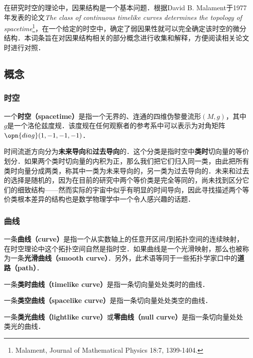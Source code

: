 



在研究时空的理论中，因果结构是一个基本问题．根据David B. Malament于1977年发表的论文\textsl{The class of continuous timelike curves determines the topology of spacetime}\footnote{Malament, Journal of Mathematical Physics 18:7, 1399-1404. }，在一个给定的时空中，确定了弱因果性就可以完全确定该时空的微分结构．本词条旨在对因果结构相关的部分概念进行收集和解释，方便阅读相关论文时进行对照．

\subsection{概念}

\subsubsection{时空}

一个\textbf{时空（spacetime）}是指一个无界的、连通的四维伪黎曼流形$(M, g)$，其中$g$是一个洛伦兹度规．该度规在任何观察者的参考系中可以表示为对角矩阵$\opn{diag}(1, -1, -1, -1)$．

时间流逝方向分为\textbf{未来导向}和\textbf{过去导向}的．这个分类是指时空中\textbf{类时}切向量的等价划分．如果两个类时切向量的内积为正，那么我们把它们归入同一类，由此把所有类时向量分成两类，称其中一类为未来导向的，另一类为过去导向的．未来和过去的选择是随机的，因为在目前的研究中两个等价类是完全等同的，尚未找到区分它们的细致结构——然而实际的宇宙中似乎有明显的时间导向，因此寻找描述两个等价类根本差异的结构也是数学物理学中一个令人感兴趣的话题．

\subsubsection{曲线}

一条\textbf{曲线（curve）}是指一个从实数轴上的任意开区间$I$到拓扑空间的连续映射，在时空理论中这个拓扑空间自然是指时空．如果曲线是一个光滑映射，那么也被称为一条\textbf{光滑曲线（smooth curve）}．另外，此术语等同于一些拓扑学家口中的\textbf{道路（path）}．

一条\textbf{类时曲线（timelike curve）}是指一条切向量处处类时的曲线．

一条\textbf{类空曲线（spacelike curve）}是指一条切向量处处类空的曲线．

一条\textbf{类光曲线（lightlike curve）}或\textbf{零曲线（null curve）}是指一条切向量处处类光的曲线．

